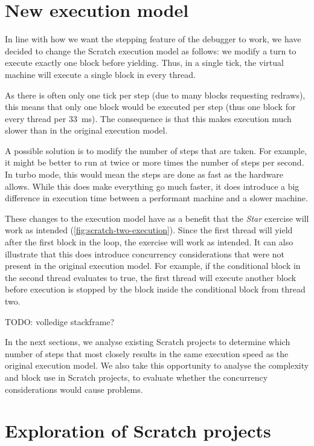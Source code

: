 \documentclass[../main]{subfiles}
\begin{document}
\section{New execution model}\label{sec:a-family-of-new-execution-models}

In line with how we want the stepping feature of the debugger to work, we have decided to change the Scratch execution model as follows: we modify a turn to execute exactly one block before yielding.
Thus, in a single tick, the virtual machine will execute a single block in every thread.

As there is often only one tick per step (due to many blocks requesting redraws), this means that only one block would be executed per step (thus one block for every thread per \qty{33}{\milli\second}).
The consequence is that this makes execution much slower than in the original execution model.

A possible solution is to modify the number of steps that are taken.
For example, it might be better to run at twice or more times the number of steps per second.
In turbo mode, this would mean the steps are done as fast as the hardware allows.
While this does make everything go much faster, it does introduce a big difference in execution time between a performant machine and a slower machine.

These changes to the execution model have as a benefit that the \emph{Star} exercise will work as intended (\cref{fig:scratch-two-execution}).
Since the first thread will yield after the first block in the loop, the exercise will work as intended.
It can also illustrate that this does introduce concurrency considerations that were not present in the original execution model.
For example, if the conditional block in the second thread evaluates to true, the first thread will execute another block before execution is stopped by the block inside the conditional block from thread two.

TODO: volledige stackframe?

In the next sections, we analyse existing Scratch projects to determine which number of steps that most closely results in the same execution speed as the original execution model.
We also take this opportunity to analyse the complexity and block use in Scratch projects, to evaluate whether the concurrency considerations would cause problems.

\section{Exploration of Scratch projects}\label{sec:evaluation-of-scratch-projects}
\end{document}
